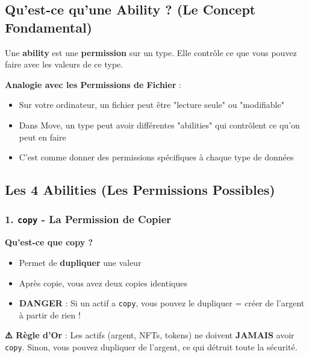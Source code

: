 \documentclass[11pt]{article}
\begin{document}
\subsection{Qu'est-ce qu'une Ability ? (Le Concept Fondamental)}

Une \textbf{ability} est une \textbf{permission} sur un type. Elle contrôle ce que vous pouvez faire avec les valeurs de ce type.

\begin{explainBox}
\textbf{Analogie avec les Permissions de Fichier} :
\begin{itemize}
  \item Sur votre ordinateur, un fichier peut être "lecture seule" ou "modifiable"
  \item Dans Move, un type peut avoir différentes "abilities" qui contrôlent ce qu'on peut en faire
  \item C'est comme donner des permissions spécifiques à chaque type de données
\end{itemize}
\end{explainBox}

\subsection{Les 4 Abilities (Les Permissions Possibles)}

\subsubsection{1. \texttt{copy} - La Permission de Copier}

\begin{explainBox}
\textbf{Qu'est-ce que copy ?}
\begin{itemize}
  \item Permet de \textbf{dupliquer} une valeur
  \item Après copie, vous avez deux copies identiques
  \item \textbf{DANGER} : Si un actif a \texttt{copy}, vous pouvez le dupliquer = créer de l'argent à partir de rien !
\end{itemize}
\end{explainBox}

\begin{warnBox}
\textbf{⚠️ Règle d'Or} : Les actifs (argent, NFTs, tokens) ne doivent \textbf{JAMAIS} avoir \texttt{copy}. Sinon, vous pouvez dupliquer de l'argent, ce qui détruit toute la sécurité.
\end{warnBox}
\end{document}

